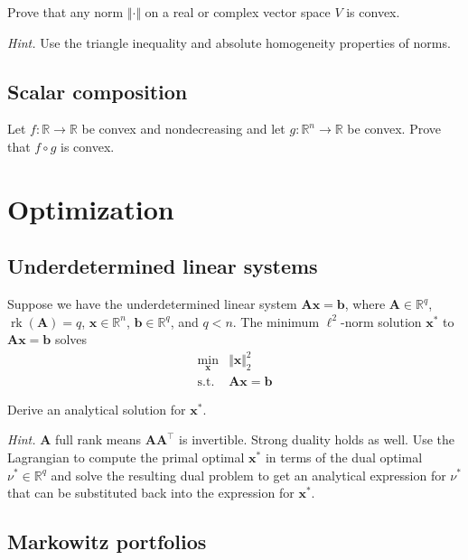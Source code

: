 \documentclass{article}
\numberwithin{equation}{section}
\begin{document}
Prove that any norm $ \Vert\cdot\Vert $ on a real or complex vector space
$ V $ is convex.

\medskip

\textit{Hint.} Use the triangle inequality and absolute homogeneity properties
of norms.

\subsection{Scalar composition}

Let $ f : \mathbb{R} \rightarrow \mathbb{R} $ be convex and nondecreasing
and let $ g : \mathbb{R}^n \rightarrow \mathbb{R} $ be convex. Prove that
$ f \circ g $ is convex.

\section{Optimization}

\subsection{Underdetermined linear systems}

Suppose we have the underdetermined linear system $ \mathbf{Ax} = \mathbf{b} $,
where $ \mathbf{A} \in \mathbb{R}^q $, $ \operatorname{rk}(\mathbf{A}) = q $,
$ \mathbf{x} \in \mathbb{R}^n $, $ \mathbf{b} \in \mathbb{R}^q $, and
$ q < n $. The minimum $ \ell^2 $-norm solution $ \mathbf{x}^* $ to
$ \mathbf{Ax} = \mathbf{b} $ solves
\begin{equation*}
    \begin{array}{ll}
        \displaystyle\min_\mathbf{x} & \Vert\mathbf{x}\Vert_2^2 \\
        \text{s.t.} & \mathbf{Ax} = \mathbf{b}
    \end{array}
\end{equation*}

Derive an analytical solution for $ \mathbf{x}^* $.

\medskip

\textit{Hint.} $ \mathbf{A} $ full rank means $ \mathbf{AA}^\top $ is
invertible. Strong duality holds as well. Use the Lagrangian to compute the
primal optimal $ \mathbf{x}^* $ in terms of the dual optimal
$ \nu^* \in \mathbb{R}^q $ and solve the resulting dual problem to get an
analytical expression for $ \nu^* $ that can be substituted back into the
expression for $ \mathbf{x}^* $.

\subsection{Markowitz portfolios}
\end{document}
